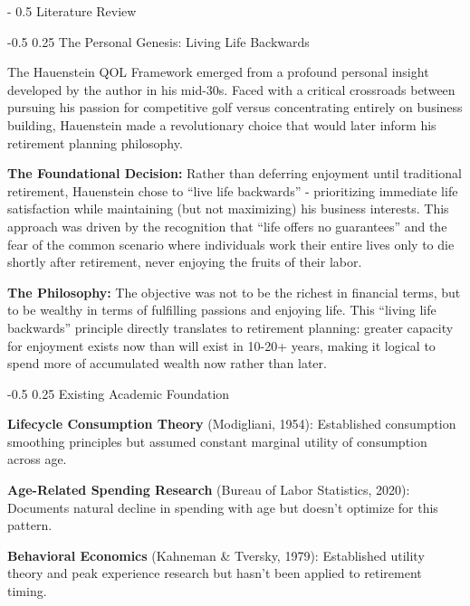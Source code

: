 \documentclass[12pt,a4paper]{article}
\makeatletter
\renewcommand{\section}{\@startsection{section}{1}{0mm}%
                                {-\baselineskip}%
                                {0.5\baselineskip}%
                                {\normalfont\Large\bfseries}}
\renewcommand{\subsection}{\@startsection{subsection}{2}{0mm}%
                                {-0.5\baselineskip}%
                                {0.25\baselineskip}%
                                {\normalfont\large\bfseries}}
\makeatother
\begin{document}
\section{Literature Review}

\subsection{The Personal Genesis: Living Life Backwards}

The Hauenstein QOL Framework emerged from a profound personal insight developed by the author in his mid-30s. Faced with a critical crossroads between pursuing his passion for competitive golf versus concentrating entirely on business building, Hauenstein made a revolutionary choice that would later inform his retirement planning philosophy.

\textbf{The Foundational Decision:} Rather than deferring enjoyment until traditional retirement, Hauenstein chose to ``live life backwards'' - prioritizing immediate life satisfaction while maintaining (but not maximizing) his business interests. This approach was driven by the recognition that ``life offers no guarantees'' and the fear of the common scenario where individuals work their entire lives only to die shortly after retirement, never enjoying the fruits of their labor.

\textbf{The Philosophy:} The objective was not to be the richest in financial terms, but to be wealthy in terms of fulfilling passions and enjoying life. This ``living life backwards'' principle directly translates to retirement planning: greater capacity for enjoyment exists now than will exist in 10-20+ years, making it logical to spend more of accumulated wealth now rather than later.

\subsection{Existing Academic Foundation}

\textbf{Lifecycle Consumption Theory} (Modigliani, 1954): Established consumption smoothing principles but assumed constant marginal utility of consumption across age.

\textbf{Age-Related Spending Research} (Bureau of Labor Statistics, 2020): Documents natural decline in spending with age but doesn't optimize for this pattern.

\textbf{Behavioral Economics} (Kahneman \& Tversky, 1979): Established utility theory and peak experience research but hasn't been applied to retirement timing.
\end{document}
